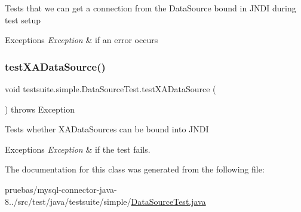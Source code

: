 Tests that we can get a connection from the Data\+Source bound in J\+N\+DI during test setup


\begin{DoxyExceptions}{Exceptions}
{\em Exception} & if an error occurs \\
\hline
\end{DoxyExceptions}
\mbox{\label{classtestsuite_1_1simple_1_1_data_source_test_aeffb3e326e27d83bfc0da82269ef479b}} 
\subsubsection{\texorpdfstring{test\+X\+A\+Data\+Source()}{testXADataSource()}}
{\footnotesize\ttfamily void testsuite.\+simple.\+Data\+Source\+Test.\+test\+X\+A\+Data\+Source (\begin{DoxyParamCaption}{ }\end{DoxyParamCaption}) throws Exception}

Tests whether X\+A\+Data\+Sources can be bound into J\+N\+DI


\begin{DoxyExceptions}{Exceptions}
{\em Exception} & if the test fails. \\
\hline
\end{DoxyExceptions}


The documentation for this class was generated from the following file\+:\begin{DoxyCompactItemize}
\item 
pruebas/mysql-\/connector-\/java-\/8../src/test/java/testsuite/simple/\mbox{\hyperlink{_data_source_test_8java}{Data\+Source\+Test.\+java}}\end{DoxyCompactItemize}
